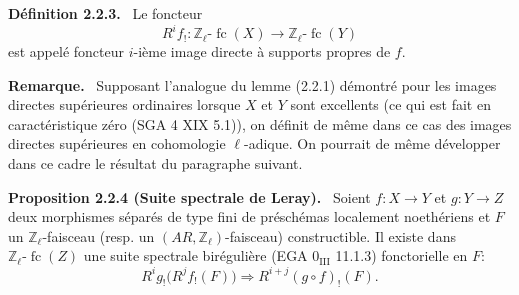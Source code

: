 \documentclass[11pt]{article}
\newenvironment{statement}[1]{\par\medskip\noindent\textbf{#1.}\ }{\par\medskip}
\providecommand{\fc}{\operatorname{fc}}
\begin{document}
\begin{statement}{Définition 2.2.3}
Le foncteur
\[
R^if_!:\mathbb Z_\ell\text{-}\fc(X)\longrightarrow \mathbb Z_\ell\text{-}\fc(Y)
\]
est appelé foncteur \(i\)-ième image directe à supports propres de \(f\).
\end{statement}

\begin{statement}{Remarque}
Supposant l'analogue du lemme (2.2.1) démontré pour les images directes supérieures ordinaires lorsque \(X\) et \(Y\) sont excellents (ce qui est fait en caractéristique zéro (SGA 4 XIX 5.1)), on définit de même dans ce cas des images directes supérieures en cohomologie \(\ell\)-adique. On pourrait de même développer dans ce cadre le résultat du paragraphe suivant.
\end{statement}

\begin{statement}{Proposition 2.2.4 (Suite spectrale de Leray)}
Soient \(f:X\to Y\) et \(g:Y\to Z\) deux morphismes séparés de type fini de préschémas localement noethériens et \(F\) un \(\mathbb Z_\ell\)-faisceau (resp. un \((AR,\mathbb Z_\ell)\)-faisceau) constructible. Il existe dans \(\mathbb Z_\ell\text{-}\fc(Z)\) une suite spectrale birégulière (EGA \(0_{\mathrm{III}}\) 11.1.3) fonctorielle en \(F\):
\[
R^i g_!\bigl(R^j f_!(F)\bigr)\Longrightarrow R^{i+j}(g\circ f)_!(F).
\]
\end{statement}
\end{document}
